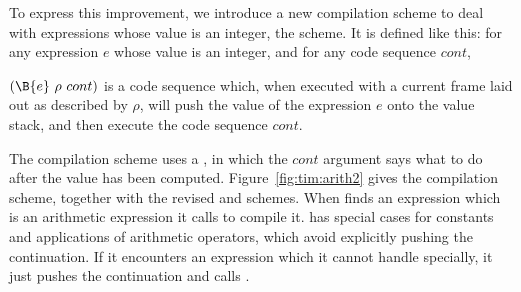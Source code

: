 To express this improvement, we introduce a new compilation scheme to deal
with expressions whose value is an integer,
the \tB{} scheme.  It is defined like this: for any expression
$e$ whose value is an integer, and for any code sequence $cont$,
\begin{important}
$(\B{e}~\rho~cont)$ is a code sequence which, when executed with a current
frame laid out as described by $\rho$, will push the
value of the expression $e$ onto the value stack, and then execute the code
sequence $cont$.
\end{important}
The compilation scheme uses a , in which
the $cont$ argument says what to do after the value has been computed.
Figure~\ref{fig:tim:arith2} gives the \tB{} compilation scheme,
together with the revised
\tR{} and \tA{} schemes.
When \tR{} finds an expression which is an arithmetic expression it calls
\tB{} to compile it.  \tB{} has special cases for constants and
applications of
arithmetic operators, which avoid explicitly pushing the continuation.
If it encounters an expression which it cannot handle specially, it just
pushes the continuation and calls \tR{}.
